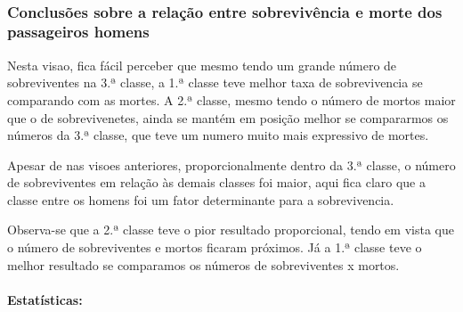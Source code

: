\documentclass[11pt]{article}
\begin{document}
    \begin{center}
    \end{center}
    { \hspace*{\fill} \\}
    
    \subsubsection{Conclusões sobre a relação entre sobrevivência e morte
dos passageiros
homens}\label{conclusuxf5es-sobre-a-relauxe7uxe3o-entre-sobrevivuxeancia-e-morte-dos-passageiros-homens}

Nesta visao, fica fácil perceber que mesmo tendo um grande número de
sobreviventes na 3.ª classe, a 1.ª classe teve melhor taxa de
sobrevivencia se comparando com as mortes. A 2.ª classe, mesmo tendo o
número de mortos maior que o de sobrevivenetes, ainda se mantém em
posição melhor se compararmos os números da 3.ª classe, que teve um
numero muito mais expressivo de mortes.

Apesar de nas visoes anteriores, proporcionalmente dentro da 3.ª classe,
o número de sobreviventes em relação às demais classes foi maior, aqui
fica claro que a classe entre os homens foi um fator determinante para a
sobrevivencia.

Observa-se que a 2.ª classe teve o pior resultado proporcional, tendo em
vista que o número de sobreviventes e mortos ficaram próximos. Já a 1.ª
classe teve o melhor resultado se comparamos os números de sobreviventes
x mortos.

\paragraph{Estatísticas:}\label{estatuxedsticas}
\end{document}
